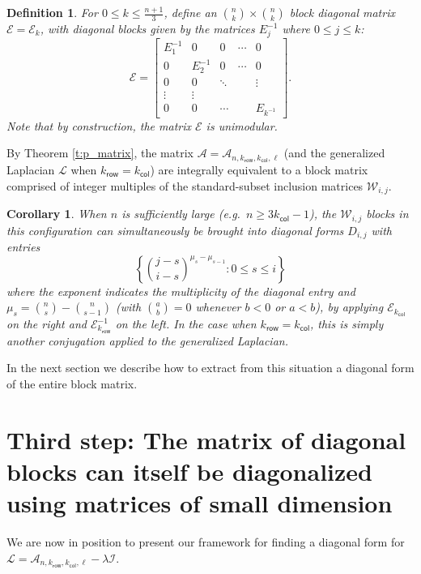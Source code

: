 \documentclass[11pt]{article}
\newtheorem{corollary}[theo]{Corollary}
\newtheorem{definition}[theo]{Definition}
\theoremstyle{definition}
\providecommand{\eg}{e.g.\ }
\numberwithin{equation}{section}
\numberwithin{equation}{section}
\renewcommand{\L}{\mathcal{L}}
\newcommand{\E}{\mathcal{E}}
\newcommand{\I}{\mathcal{I}}
\newcommand{\W}{\mathcal{W}}
\newcommand{\A}{\mathcal{A}}
\newcommand{\kr}{{k}_{\mathsf{row}}}
\newcommand{\kc}{{k}_{\mathsf{col}}}
\begin{document}
\begin{definition}
For $0 \leq k \leq \frac{n+1}{3}$, define an $\binom{n}{k} \times \binom{n}{k}$ block diagonal matrix $\E=\E_{k}$, with diagonal blocks given by the matrices $E_{j}^{-1}$ where $0 \leq j \leq k$:
    \[
    \E = \begin{bmatrix}
        E_{1}^{-1} & 0 & 0 & \cdots &0 \\
        0 & E_{2}^{-1} &  0 & \cdots &0\\
        0 & 0 & \ddots & & \vdots \\
        \vdots & \vdots & & &\\
        0 & 0 & \cdots & & E_{k^{-1}}
    \end{bmatrix}.
    \]
Note that by construction, the matrix $\E$ is unimodular.
\end{definition}

By Theorem \ref{t:p_matrix}, the matrix $\A = \A_{n, \kr, \kc, \ell}$ (and the generalized Laplacian $\L$ when $\kr=\kc$) are integrally equivalent to a block matrix comprised of integer multiples of the standard-subset inclusion matrices $\W_{i,j}$.

\begin{corollary}\label{c:w_diagonal}
When $n$ is sufficiently large (\eg $n \geq 3\kc - 1$), the $\W_{i,j}$ blocks in this configuration can simultaneously be brought into diagonal forms $D_{i,j}$ with entries 
\[ \left\{ \binom{j-s}{i-s}^{\mu_s - \mu_{s-1}} : 0 \leq s \leq i \right\} \]
where the exponent indicates the multiplicity of the diagonal entry and $\mu_s = \binom{n}{s} - \binom{n}{s-1}$ (with $\binom{a}{b} = 0$ whenever $b<0$ or $a<b$), by applying $\E_{\kc}$ on the right and $\E_{\kr}^{-1}$ on the left.  In the case when $\kr=\kc$, this is simply another conjugation applied to the generalized Laplacian.
\end{corollary}

In the next section we describe how to extract from this situation a diagonal form of the entire block matrix.



\section{Third step:  The matrix of diagonal blocks can itself be diagonalized using matrices of small dimension}\label{s:diagonalize}

We are now in position to present our framework for finding a diagonal form for $\L = \A_{n,\kr,\kc,\ell} - \lambda \I$.  
\end{document}
